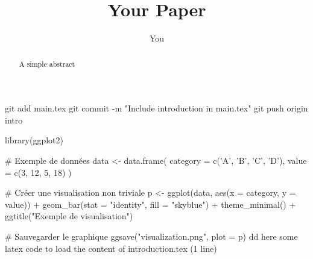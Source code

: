 \documentclass{article}
\title{Your Paper}
\author{You}
\begin{document}
\maketitle
\begin{abstract}
A simple abstract
\end{abstract}

git add main.tex
git commit -m "Include introduction in main.tex"
git push origin intro


library(ggplot2)

# Exemple de données
data <- data.frame(
  category = c('A', 'B', 'C', 'D'),
  value = c(3, 12, 5, 18)
)

# Créer une visualisation non triviale
p <- ggplot(data, aes(x = category, y = value)) +
  geom_bar(stat = "identity", fill = "skyblue") +
  theme_minimal() +
  ggtitle("Exemple de visualisation")

# Sauvegarder le graphique
ggsave("visualization.png", plot = p)
dd here some latex code to load the content of  introduction.tex (1 line)	




\end{document}
